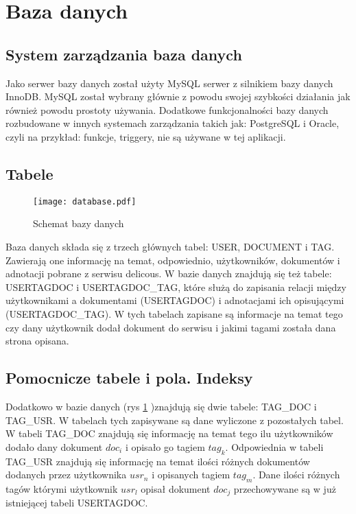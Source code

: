 \section{Baza danych}

\subsection{System zarządzania baza danych}

Jako serwer bazy danych został użyty MySQL serwer z silnikiem bazy danych InnoDB. MySQL został wybrany głównie z powodu swojej szybkości działania jak również powodu prostoty używania. Dodatkowe funkcjonalności bazy danych rozbudowane w innych systemach zarządzania takich jak: PostgreSQL i Oracle, czyli na przykład: funkcje, triggery, nie są używane w tej aplikacji. 

\subsection{Tabele}


\begin{figure}[htb]
\centering
\texttt{[image: database.pdf]}
\caption{Schemat bazy danych}
\label{fig:db_fig}
\end{figure}

Baza danych składa się z trzech głównych tabel: USER, DOCUMENT i TAG. Zawierają one informację na temat, odpowiednio, użytkowników, dokumentów i adnotacji pobrane z serwisu delicous. W bazie danych znajdują się też tabele: USERTAGDOC i USERTAGDOC\_TAG, które służą do zapisania relacji między użytkownikami a dokumentami (USERTAGDOC) i adnotacjami ich opisującymi (USERTAGDOC\_TAG). W tych tabelach zapisane są  informacje na temat tego czy dany użytkownik dodał dokument do serwisu i jakimi tagami została dana strona opisana.

\subsection{Pomocnicze tabele i pola. Indeksy}
Dodatkowo w bazie danych (rys \ref{fig:db_fig} )znajdują się dwie tabele: TAG\_DOC i TAG\_USR. W tabelach tych zapisywane są dane wyliczone z pozostałych tabel. W tabeli TAG\_DOC znajdują się informację na temat tego ilu użytkowników dodało dany dokument $doc_i$  i opisało go tagiem $tag_k$. Odpowiednia w tabeli TAG\_USR znajdują się informację na temat ilości różnych dokumentów dodanych przez użytkownika $usr_n$ i opisanych tagiem $tag_m$. Dane ilości różnych tagów którymi użytkownik $usr_l$ opisał dokument $doc_j$ przechowywane są w już istniejącej tabeli USERTAGDOC. 

